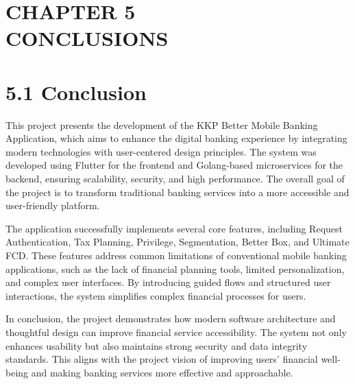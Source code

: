 \section{}\label{section-47}

\section{\texorpdfstring{\hfill\break
}{ }}\label{section-48}

\section{\texorpdfstring{\textbf{CHAPTER 5\\
CONCLUSIONS}}{CHAPTER 5 CONCLUSIONS}}\label{chapter-5-conclusions}

\section{\texorpdfstring{\textbf{5.1
Conclusion}}{5.1 Conclusion}}\label{conclusion}

This project presents the development of the KKP Better Mobile Banking
Application, which aims to enhance the digital banking experience by
integrating modern technologies with user-centered design principles.
The system was developed using Flutter for the frontend and Golang-based
microservices for the backend, ensuring scalability, security, and high
performance. The overall goal of the project is to transform traditional
banking services into a more accessible and user-friendly platform.

The application successfully implements several core features, including
Request Authentication, Tax Planning, Privilege, Segmentation, Better
Box, and Ultimate FCD. These features address common limitations of
conventional mobile banking applications, such as the lack of financial
planning tools, limited personalization, and complex user interfaces. By
introducing guided flows and structured user interactions, the system
simplifies complex financial processes for users.

In conclusion, the project demonstrates how modern software architecture
and thoughtful design can improve financial service accessibility. The
system not only enhances usability but also maintains strong security
and data integrity standards. This aligns with the project vision of
improving users' financial well-being and making banking services more
effective and approachable.

